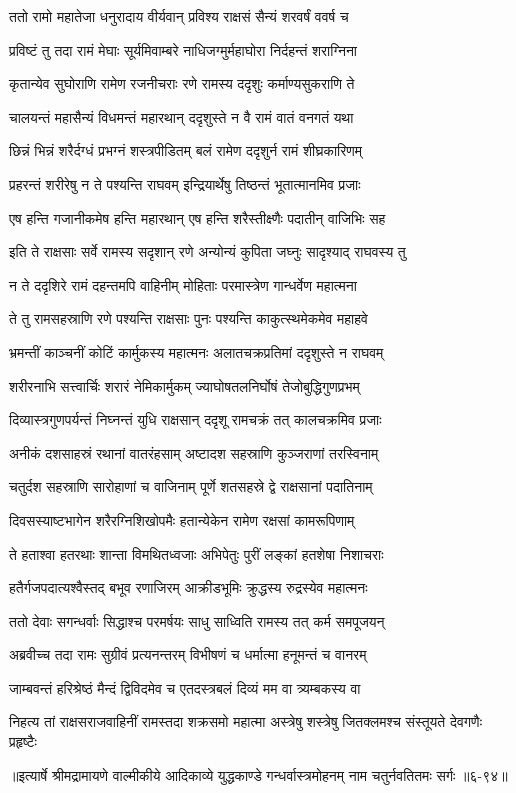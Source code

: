 \twolineshloka
{ततो रामो महातेजा धनुरादाय वीर्यवान्}
{प्रविश्य राक्षसं सैन्यं शरवर्षं ववर्ष च} %

\twolineshloka
{प्रविष्टं तु तदा रामं मेघाः सूर्यमिवाम्बरे}
{नाधिजग्मुर्महाघोरा निर्दहन्तं शराग्निना} %

\twolineshloka
{कृतान्येव सुघोराणि रामेण रजनीचराः}
{रणे रामस्य ददृशुः कर्माण्यसुकराणि ते} %

\twolineshloka
{चालयन्तं महासैन्यं विधमन्तं महारथान्}
{ददृशुस्ते न वै रामं वातं वनगतं यथा} %

\twolineshloka
{छिन्नं भिन्नं शरैर्दग्धं प्रभग्नं शस्त्रपीडितम्}
{बलं रामेण ददृशुर्न रामं शीघ्रकारिणम्} %

\twolineshloka
{प्रहरन्तं शरीरेषु न ते पश्यन्ति राघवम्}
{इन्द्रियार्थेषु तिष्ठन्तं भूतात्मानमिव प्रजाः} %

\twolineshloka
{एष हन्ति गजानीकमेष हन्ति महारथान्}
{एष हन्ति शरैस्तीक्ष्णैः पदातीन् वाजिभिः सह} %

\twolineshloka
{इति ते राक्षसाः सर्वे रामस्य सदृशान् रणे}
{अन्योन्यं कुपिता जघ्नुः सादृश्याद् राघवस्य तु} %

\twolineshloka
{न ते ददृशिरे रामं दहन्तमपि वाहिनीम्}
{मोहिताः परमास्त्रेण गान्धर्वेण महात्मना} %

\twolineshloka
{ते तु रामसहस्राणि रणे पश्यन्ति राक्षसाः}
{पुनः पश्यन्ति काकुत्स्थमेकमेव महाहवे} %

\twolineshloka
{भ्रमन्तीं काञ्चनीं कोटिं कार्मुकस्य महात्मनः}
{अलातचक्रप्रतिमां ददृशुस्ते न राघवम्} %

\twolineshloka
{शरीरनाभि सत्त्वार्चिः शरारं नेमिकार्मुकम्}
{ज्याघोषतलनिर्घोषं तेजोबुद्धिगुणप्रभम्} %

\twolineshloka
{दिव्यास्त्रगुणपर्यन्तं निघ्नन्तं युधि राक्षसान्}
{ददृशू रामचक्रं तत् कालचक्रमिव प्रजाः} %

\twolineshloka
{अनीकं दशसाहस्रं रथानां वातरंहसाम्}
{अष्टादश सहस्राणि कुञ्जराणां तरस्विनाम्} %

\twolineshloka
{चतुर्दश सहस्राणि सारोहाणां च वाजिनाम्}
{पूर्णे शतसहस्रे द्वे राक्षसानां पदातिनाम्} %

\twolineshloka
{दिवसस्याष्टभागेन शरैरग्निशिखोपमैः}
{हतान्येकेन रामेण रक्षसां कामरूपिणाम्} %

\twolineshloka
{ते हताश्वा हतरथाः शान्ता विमथितध्वजाः}
{अभिपेतुः पुरीं लङ्कां हतशेषा निशाचराः} %

\twolineshloka
{हतैर्गजपदात्यश्वैस्तद् बभूव रणाजिरम्}
{आक्रीडभूमिः क्रुद्धस्य रुद्रस्येव महात्मनः} %

\twolineshloka
{ततो देवाः सगन्धर्वाः सिद्धाश्च परमर्षयः}
{साधु साध्विति रामस्य तत् कर्म समपूजयन्} %

\twolineshloka
{अब्रवीच्च तदा रामः सुग्रीवं प्रत्यनन्तरम्}
{विभीषणं च धर्मात्मा हनूमन्तं च वानरम्} %

\twolineshloka
{जाम्बवन्तं हरिश्रेष्ठं मैन्दं द्विविदमेव च}
{एतदस्त्रबलं दिव्यं मम वा त्र्यम्बकस्य वा} %

\twolineshloka
{निहत्य तां राक्षसराजवाहिनीं रामस्तदा शक्रसमो महात्मा}
{अस्त्रेषु शस्त्रेषु जितक्लमश्च संस्तूयते देवगणैः प्रहृष्टैः} %


॥इत्यार्षे श्रीमद्रामायणे वाल्मीकीये आदिकाव्ये युद्धकाण्डे गन्धर्वास्त्रमोहनम् नाम चतुर्नवतितमः सर्गः ॥६-९४॥
